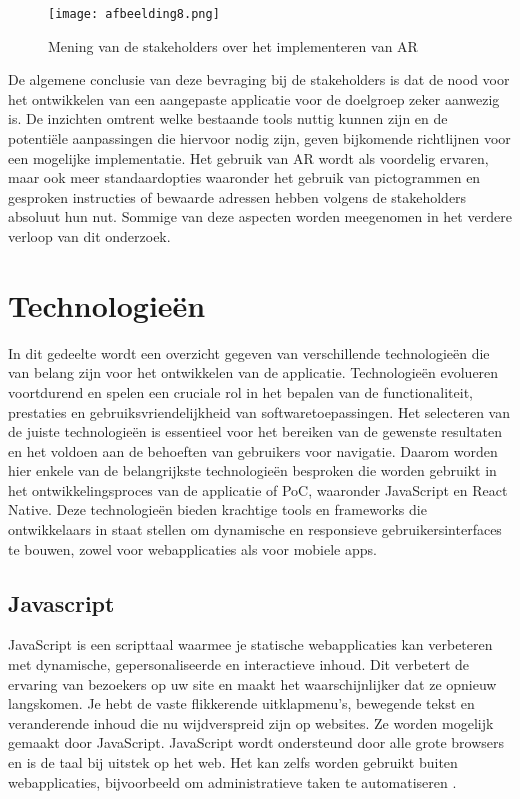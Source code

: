 \begin{figure}[h]
    \centering
    \texttt{[image: afbeelding8.png]}
    \caption{Mening van de stakeholders over het implementeren van AR}
    \label{fig:meningar}
\end{figure}

De algemene conclusie van deze bevraging bij de stakeholders is dat de nood voor het ontwikkelen van een aangepaste applicatie voor de doelgroep zeker aanwezig is. De inzichten omtrent welke bestaande tools nuttig kunnen zijn en de potentiële aanpassingen die hiervoor nodig zijn, geven bijkomende richtlijnen voor een mogelijke implementatie. Het gebruik van AR wordt als voordelig ervaren, maar ook meer standaardopties waaronder het gebruik van pictogrammen en gesproken instructies of bewaarde adressen hebben volgens de stakeholders absoluut hun nut. Sommige van deze aspecten worden meegenomen in het verdere verloop van dit onderzoek.

\section{Technologieën}
\label{sec:technologieën}

In dit gedeelte wordt een overzicht gegeven van verschillende technologieën die van belang zijn voor het ontwikkelen van de applicatie. Technologieën evolueren voortdurend en spelen een cruciale rol in het bepalen van de functionaliteit, prestaties en gebruiksvriendelijkheid van softwaretoepassingen. Het selecteren van de juiste technologieën is essentieel voor het bereiken van de gewenste resultaten en het voldoen aan de behoeften van gebruikers voor navigatie. Daarom worden hier enkele van de belangrijkste technologieën besproken die worden gebruikt in het ontwikkelingsproces van de applicatie of PoC, waaronder JavaScript en React Native. Deze technologieën bieden krachtige tools en frameworks die ontwikkelaars in staat stellen om dynamische en responsieve gebruikersinterfaces te bouwen, zowel voor webapplicaties als voor mobiele apps.

\subsection{Javascript}
\label{sec:javascript}

JavaScript is een scripttaal waarmee je statische webapplicaties kan verbeteren met dynamische, gepersonaliseerde en interactieve inhoud. Dit verbetert de ervaring van bezoekers op uw site en maakt het waarschijnlijker dat ze opnieuw langskomen. Je hebt de vaste flikkerende uitklapmenu's, bewegende tekst en veranderende inhoud die nu wijdverspreid zijn op websites. Ze worden mogelijk gemaakt door JavaScript. JavaScript wordt ondersteund door alle grote browsers en is de taal bij uitstek op het web. Het kan zelfs worden gebruikt buiten webapplicaties, bijvoorbeeld om administratieve taken te automatiseren \autocite{Wilton2004}.

